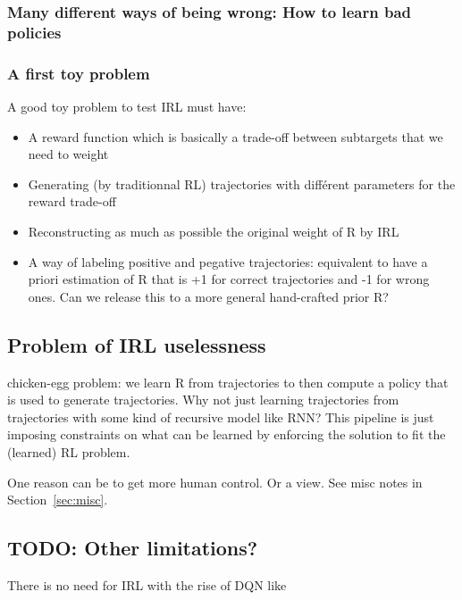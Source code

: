 \documentclass{article}
\begin{document}
\subsubsection{Many different ways of being wrong: How to learn bad policies}

\subsubsection{A first toy problem}

A good toy problem to test IRL must have:

\begin{itemize}
    \item A reward function which is basically a trade-off between subtargets that we need to weight
    \item Generating (by traditionnal RL) trajectories with différent parameters for the reward trade-off
    \item Reconstructing as much as possible the original weight of R by IRL
    \item A way of labeling positive and pegative trajectories: equivalent to have a priori estimation of R that is +1 for correct trajectories and -1 for wrong ones. Can we release this to a more general hand-crafted prior R?
\end{itemize}

\subsection{Problem of IRL uselessness}

chicken-egg problem: we learn R from trajectories to then compute a policy that is used to generate trajectories. Why not just learning trajectories from trajectories with some kind of recursive model like RNN? This pipeline is just imposing constraints on what can be learned by enforcing the solution to fit the (learned) RL problem.

One reason can be to get more human control. Or a view. See misc notes in Section~\ref{sec:misc}.

\subsection{TODO: Other limitations?}

There is no need for IRL with the rise of DQN like \cite{Mnih15}


\end{document}
